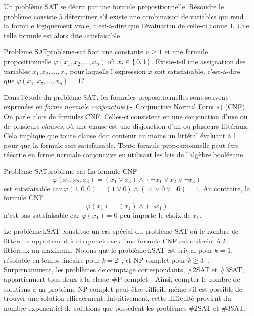 Un problème SAT se décrit par une formule propositionnelle. Résoudre le problème consiste à déterminer s'il existe une combinaison de variables qui rend la formule logiquement vraie, c'est-à-dire que l'évaluation de celle-ci donne 1. Une telle formule est alors dite satisfaisable.

\begin{maindefinition}{Problème SAT}{probleme-sat}
    Soit une constante $n \geq 1$ et une formule propositionnelle $\varphi(x_{1}, x_{2}, \dots, x_{n})$ où $x_{i} \in \set{ 0, 1 }$.  Existe-t-il une assignation des variables $x_{1}, x_{2}, \dots, x_{n}$ pour laquelle l'expression $\varphi$ soit satisfaisable, c'est-à-dire que $\varphi(x_{1}, x_{2}, \dots, x_{n})=1$?
\end{maindefinition}

Dans l'étude du problème SAT, les formules propositionnelles sont souvent exprimées en \textit{forme normale conjonctive} (« Conjunctive Normal Form ») (CNF). On parle alors de formules CNF. Celles-ci consistent en une conjonction d'une ou de plusieurs \textit{clauses}, où une clause est une disjonction d'un ou plusieurs littéraux. Cela implique que toute clause doit contenir au moins un littéral évaluant à 1 pour que la formule soit satisfaisable. Toute formule propositionnelle peut être réécrite en forme normale conjonctive en utilisant les lois de l'algèbre booléenne.

\begin{example}{Problème SAT}{probleme-sat}
    La formule CNF
    \begin{equation*}
        \varphi(x_{1}, x_{2}, x_{3}) = (x_{1} \lor x_{3}) \land (\neg x_{1} \lor x_{2} \lor \neg x_{3})
    \end{equation*}
    est satisfaisable car $\varphi(1,0,0) = (1 \lor 0) \land (\neg 1 \lor 0 \lor \neg 0) = 1$. Au contraire, la formule CNF
    \begin{equation*}
        \varphi(x_{1})= (x_{1}) \land (\neg x_{1})
    \end{equation*}
    n'est pas satisfaisable car $\varphi (x_{1}) = 0$ peu importe le choix de $x_{1}$.
\end{example}

Le problème kSAT constitue un cas spécial du problème SAT où le nombre de littéraux appartenant à chaque clause d'une formule CNF est restreint à $k$ littéraux au maximum. Notons que le problème kSAT est trivial pour $k=1$, résoluble en temps linéaire pour $k=2$~\cite{kromDecisionProblemClass1967}, et \textsf{NP}-complet pour $k \geq 3$~\cite{karpReducibilityCombinatorialProblems1972}. Surprenamment, les problèmes de comptage correspondants, \#2SAT et \#3SAT, appartiennent tous deux à la classe \textsf{\#P}-complet~\cite{valiantComplexityEnumerationReliability1979}. Ainsi, compter le nombre de solutions à un problème \textsf{NP}-complet peut être difficile même s'il est possible de trouver une solution efficacement. Intuitivement, cette difficulté provient du nombre exponentiel de solutions que possèdent les problèmes \#2SAT et \#3SAT.

